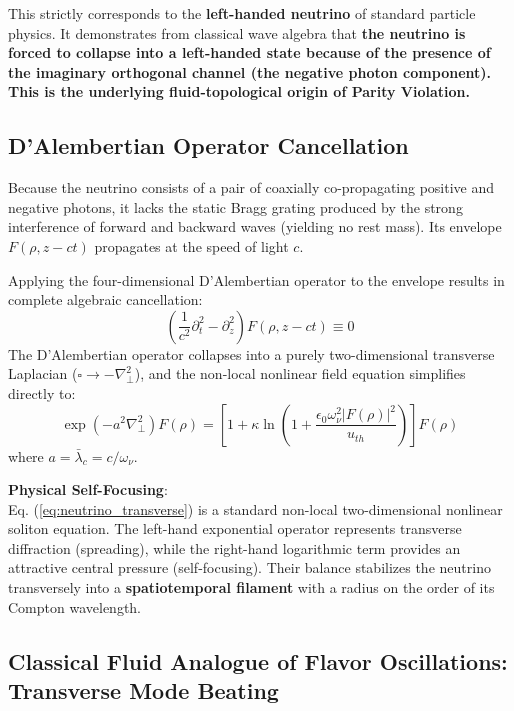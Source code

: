 \documentclass[12pt, a4paper]{article}
\begin{document}
This strictly corresponds to the \textbf{left-handed neutrino} of standard particle physics. It demonstrates from classical wave algebra that \textbf{the neutrino is forced to collapse into a left-handed state because of the presence of the imaginary orthogonal channel (the negative photon component). This is the underlying fluid-topological origin of Parity Violation.}

\subsection{D'Alembertian Operator Cancellation}

Because the neutrino consists of a pair of coaxially co-propagating positive and negative photons, it lacks the static Bragg grating produced by the strong interference of forward and backward waves (yielding no rest mass). Its envelope $F(\rho, z-ct)$ propagates at the speed of light $c$.

Applying the four-dimensional D'Alembertian operator to the envelope results in complete algebraic cancellation:
\begin{equation}
\left( \frac{1}{c^2}\partial_t^2 - \partial_z^2 \right) F(\rho, z-ct) \equiv 0 \label{eq:box_cancel}
\end{equation}
The D'Alembertian operator collapses into a purely two-dimensional transverse Laplacian ($\square \to -\nabla_\perp^2$), and the non-local nonlinear field equation simplifies directly to:
\begin{equation}
\exp\left( -a^2 \nabla_\perp^2 \right) F(\rho) = \left[ 1 + \kappa \ln\left(1 + \frac{\epsilon_0 \omega_\nu^2 |F(\rho)|^2}{u_{th}}\right) \right] F(\rho) \label{eq:neutrino_transverse}
\end{equation}
where $a = \bar{\lambda}_c = c/\omega_\nu$.

\textbf{Physical Self-Focusing}: \\
Eq. (\ref{eq:neutrino_transverse}) is a standard non-local two-dimensional nonlinear soliton equation. The left-hand exponential operator represents transverse diffraction (spreading), while the right-hand logarithmic term provides an attractive central pressure (self-focusing). Their balance stabilizes the neutrino transversely into a \textbf{spatiotemporal filament} with a radius on the order of its Compton wavelength.

\subsection{Classical Fluid Analogue of Flavor Oscillations: Transverse Mode Beating}
\end{document}
